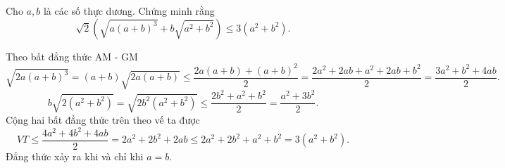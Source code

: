 \begin{problem}
	Cho $a, b$ là các số thực dương. Chứng minh rằng
	\[
		\sqrt{2}(\sqrt{a(a + b)^3} + b\sqrt{a^2 + b^2}) \le 3(a^2 + b^2).
	\]
	\solution

	Theo bất đẳng thức AM - GM
	\[
		\sqrt{2a(a + b)^3} = (a + b)\sqrt{2a(a + b)} \le \frac{2a(a + b) + (a + b)^2}{2}
		= \frac{2a^2 + 2ab + a^2 + 2ab + b^2}{2} = \frac{3a^2 + b^2 + 4ab}{2}.
	\]
	\[
		b\sqrt{2(a^2 + b^2)} = \sqrt{2b^2(a^2 + b^2)} \le \frac{2b^2 + a^2 + b^2}{2}
		= \frac{a^2 + 3b^2}{2}.
	\]
	Cộng hai bất đẳng thức trên theo vế ta được
	\[
		VT \le \frac{4a^2 + 4b^2 + 4ab}{2} = 2a^2 + 2b^2 + 2ab \le 2a^2 + 2b^2 + a^2 + b^2 = 
		3(a^2 + b^2).
	\]
	Đẳng thức xảy ra khi và chỉ khi $a = b$.
\end{problem}
